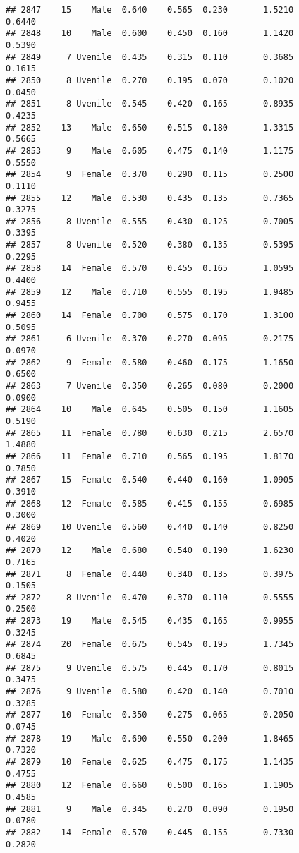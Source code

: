 \documentclass[
]{article}
\begin{document}
\begin{verbatim}
## 2847    15    Male  0.640    0.565  0.230       1.5210         0.6440
## 2848    10    Male  0.600    0.450  0.160       1.1420         0.5390
## 2849     7 Uvenile  0.435    0.315  0.110       0.3685         0.1615
## 2850     8 Uvenile  0.270    0.195  0.070       0.1020         0.0450
## 2851     8 Uvenile  0.545    0.420  0.165       0.8935         0.4235
## 2852    13    Male  0.650    0.515  0.180       1.3315         0.5665
## 2853     9    Male  0.605    0.475  0.140       1.1175         0.5550
## 2854     9  Female  0.370    0.290  0.115       0.2500         0.1110
## 2855    12    Male  0.530    0.435  0.135       0.7365         0.3275
## 2856     8 Uvenile  0.555    0.430  0.125       0.7005         0.3395
## 2857     8 Uvenile  0.520    0.380  0.135       0.5395         0.2295
## 2858    14  Female  0.570    0.455  0.165       1.0595         0.4400
## 2859    12    Male  0.710    0.555  0.195       1.9485         0.9455
## 2860    14  Female  0.700    0.575  0.170       1.3100         0.5095
## 2861     6 Uvenile  0.370    0.270  0.095       0.2175         0.0970
## 2862     9  Female  0.580    0.460  0.175       1.1650         0.6500
## 2863     7 Uvenile  0.350    0.265  0.080       0.2000         0.0900
## 2864    10    Male  0.645    0.505  0.150       1.1605         0.5190
## 2865    11  Female  0.780    0.630  0.215       2.6570         1.4880
## 2866    11  Female  0.710    0.565  0.195       1.8170         0.7850
## 2867    15  Female  0.540    0.440  0.160       1.0905         0.3910
## 2868    12  Female  0.585    0.415  0.155       0.6985         0.3000
## 2869    10 Uvenile  0.560    0.440  0.140       0.8250         0.4020
## 2870    12    Male  0.680    0.540  0.190       1.6230         0.7165
## 2871     8  Female  0.440    0.340  0.135       0.3975         0.1505
## 2872     8 Uvenile  0.470    0.370  0.110       0.5555         0.2500
## 2873    19    Male  0.545    0.435  0.165       0.9955         0.3245
## 2874    20  Female  0.675    0.545  0.195       1.7345         0.6845
## 2875     9 Uvenile  0.575    0.445  0.170       0.8015         0.3475
## 2876     9 Uvenile  0.580    0.420  0.140       0.7010         0.3285
## 2877    10  Female  0.350    0.275  0.065       0.2050         0.0745
## 2878    19    Male  0.690    0.550  0.200       1.8465         0.7320
## 2879    10  Female  0.625    0.475  0.175       1.1435         0.4755
## 2880    12  Female  0.660    0.500  0.165       1.1905         0.4585
## 2881     9    Male  0.345    0.270  0.090       0.1950         0.0780
## 2882    14  Female  0.570    0.445  0.155       0.7330         0.2820

\end{verbatim}
\end{document}
